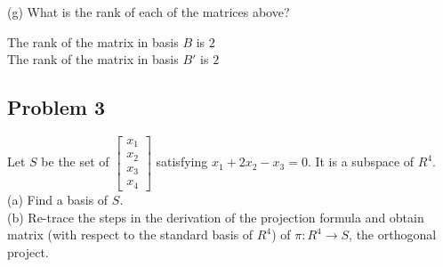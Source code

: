 \documentclass[answers,12pt,addpoints]{exam}
\begin{document}
(g) What is the rank of each of the matrices above?
\begin{solution}
    The rank of the matrix in basis $B$ is $2$\\
    The rank of the matrix in basis $B'$ is $2$
\end{solution}


\subsection*{Problem 3}
Let $S$ be the set of $\begin{bmatrix}x_1\\x_2\\x_3\\x_4\end{bmatrix}$ satisfying $x_1+2x_2-x_3=0$. It is a subspace of $R^4$.\\


(a) Find a basis of $S$.\\


(b) Re-trace the steps in the derivation of the projection formula and obtain matrix (with respect to the standard basis of $R^4$) of $\pi:R^4\to S$, the orthogonal project.
\end{document}
